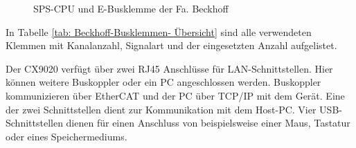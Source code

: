 \begin{figure}[htb]
\centering
{}
\caption{SPS-CPU und E-Busklemme der Fa. Beckhoff}
\label{fig:Beckhoffklemmen}
\end{figure}

In Tabelle \ref{tab: Beckhoff-Busklemmen- Übersicht} sind alle verwendeten Klemmen mit Kanalanzahl, Signalart und der eingesetzten Anzahl aufgelistet. 

Der CX9020 verfügt über zwei RJ45 Anschlüsse für LAN-Schnittstellen. Hier können weitere Buskoppler oder ein PC angeschlossen werden. Buskoppler kommunizieren über EtherCAT  und der PC über TCP/IP mit dem Gerät. Eine der zwei Schnittstellen dient zur Kommunikation mit dem Host-PC. Vier USB-Schnittstellen dienen für einen Anschluss von beispielsweise einer Maus, Tastatur  oder eines Speichermediums. 

